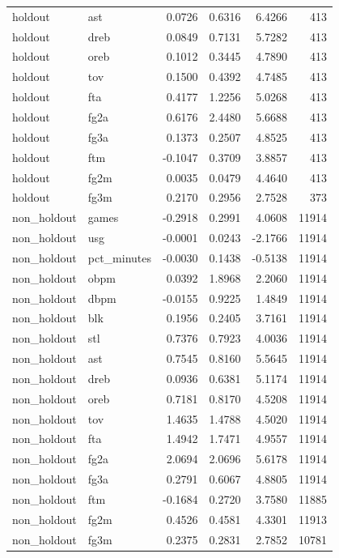 \begin{table}
\begin{tabular}{llrrrr}
holdout & ast & 0.0726 & 0.6316 & 6.4266 & 413 \\
holdout & dreb & 0.0849 & 0.7131 & 5.7282 & 413 \\
holdout & oreb & 0.1012 & 0.3445 & 4.7890 & 413 \\
holdout & tov & 0.1500 & 0.4392 & 4.7485 & 413 \\
holdout & fta & 0.4177 & 1.2256 & 5.0268 & 413 \\
holdout & fg2a & 0.6176 & 2.4480 & 5.6688 & 413 \\
holdout & fg3a & 0.1373 & 0.2507 & 4.8525 & 413 \\
holdout & ftm & -0.1047 & 0.3709 & 3.8857 & 413 \\
holdout & fg2m & 0.0035 & 0.0479 & 4.4640 & 413 \\
holdout & fg3m & 0.2170 & 0.2956 & 2.7528 & 373 \\
non\_holdout & games & -0.2918 & 0.2991 & 4.0608 & 11914 \\
non\_holdout & usg & -0.0001 & 0.0243 & -2.1766 & 11914 \\
non\_holdout & pct\_minutes & -0.0030 & 0.1438 & -0.5138 & 11914 \\
non\_holdout & obpm & 0.0392 & 1.8968 & 2.2060 & 11914 \\
non\_holdout & dbpm & -0.0155 & 0.9225 & 1.4849 & 11914 \\
non\_holdout & blk & 0.1956 & 0.2405 & 3.7161 & 11914 \\
non\_holdout & stl & 0.7376 & 0.7923 & 4.0036 & 11914 \\
non\_holdout & ast & 0.7545 & 0.8160 & 5.5645 & 11914 \\
non\_holdout & dreb & 0.0936 & 0.6381 & 5.1174 & 11914 \\
non\_holdout & oreb & 0.7181 & 0.8170 & 4.5208 & 11914 \\
non\_holdout & tov & 1.4635 & 1.4788 & 4.5020 & 11914 \\
non\_holdout & fta & 1.4942 & 1.7471 & 4.9557 & 11914 \\
non\_holdout & fg2a & 2.0694 & 2.0696 & 5.6178 & 11914 \\
non\_holdout & fg3a & 0.2791 & 0.6067 & 4.8805 & 11914 \\
non\_holdout & ftm & -0.1684 & 0.2720 & 3.7580 & 11885 \\
non\_holdout & fg2m & 0.4526 & 0.4581 & 4.3301 & 11913 \\
non\_holdout & fg3m & 0.2375 & 0.2831 & 2.7852 & 10781 \\
\bottomrule
\end{tabular}
\end{table}
